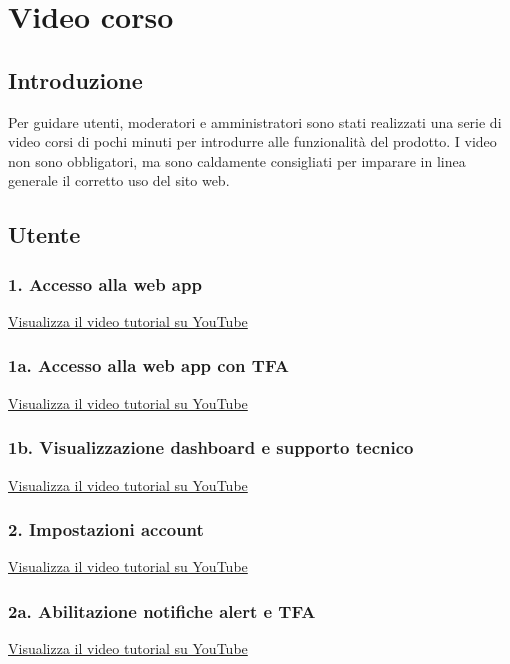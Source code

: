 \section{Video corso}

\subsection{Introduzione}

Per guidare utenti, moderatori e amministratori sono stati realizzati una serie di video corsi di pochi minuti per introdurre alle funzionalità del prodotto. I video non sono obbligatori, ma sono caldamente consigliati per imparare in linea generale il corretto uso del sito web.

\subsection{Utente}

\subsubsection{1. Accesso alla web app}
\href{https://www.youtube.com/watch?v=PjySMOLCtMA&list=PLPKYjnuIh1FA3b3jn_bwY_ztYzaFn2mIT&index=1}
{Visualizza il video tutorial su YouTube}

\subsubsection{1a. Accesso alla web app con TFA}
\href{https://www.youtube.com/watch?v=PjySMOLCtMA&list=PLPKYjnuIh1FA3b3jn_bwY_ztYzaFn2mIT&index=2}
{Visualizza il video tutorial su YouTube}

\subsubsection{1b. Visualizzazione dashboard e supporto tecnico}
\href{https://www.youtube.com/watch?v=PjySMOLCtMA&list=PLPKYjnuIh1FA3b3jn_bwY_ztYzaFn2mIT&index=3}
{Visualizza il video tutorial su YouTube}

\subsubsection{2. Impostazioni account}
\href{https://www.youtube.com/watch?v=PjySMOLCtMA&list=PLPKYjnuIh1FA3b3jn_bwY_ztYzaFn2mIT&index=4}
{Visualizza il video tutorial su YouTube}

\subsubsection{2a. Abilitazione notifiche alert e TFA}
\href{https://www.youtube.com/watch?v=PjySMOLCtMA&list=PLPKYjnuIh1FA3b3jn_bwY_ztYzaFn2mIT&index=5}
{Visualizza il video tutorial su YouTube}

